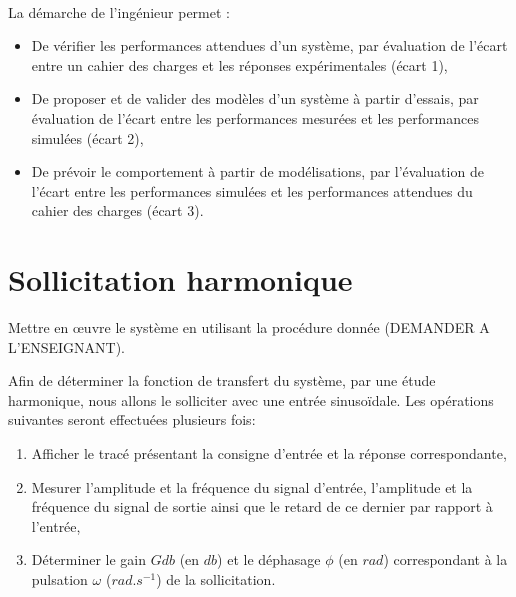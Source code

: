 
%


 \\

\graphicspath{{../../img/}}
\begin{center}
\def\svgwidth{\columnwidth}

\end{center}

La démarche de l’ingénieur permet :
\begin{itemize}
 \item De vérifier les performances attendues d’un système, par évaluation de l’écart entre un cahier des charges et les réponses expérimentales (écart 1),
 \item De proposer et de valider des modèles d’un système à partir d’essais, par évaluation de l’écart entre les performances mesurées et les performances simulées (écart 2),
 \item De prévoir le comportement à partir de modélisations, par l’évaluation de l’écart entre les performances simulées et les performances attendues du cahier des charges (écart 3).
\end{itemize}


\newpage

\section{Sollicitation harmonique}

Mettre en \oe uvre le système en utilisant la procédure donnée (DEMANDER A L'ENSEIGNANT).

Afin de déterminer la fonction de transfert du système, par une étude harmonique, nous allons le solliciter avec une entrée sinusoïdale. Les opérations suivantes seront effectuées plusieurs fois:
\begin{enumerate}
 \item Afficher le tracé présentant la consigne d'entrée et la réponse correspondante,
 \item Mesurer l'amplitude et la fréquence du signal d'entrée, l'amplitude et la fréquence du signal de sortie ainsi que le retard de ce dernier par rapport à l'entrée,
 \item Déterminer le gain $Gdb$ (en $db$) et le déphasage $\phi$ (en $rad$) correspondant à la pulsation $\omega$ ($rad.s^{-1}$) de la sollicitation.
\end{enumerate}

